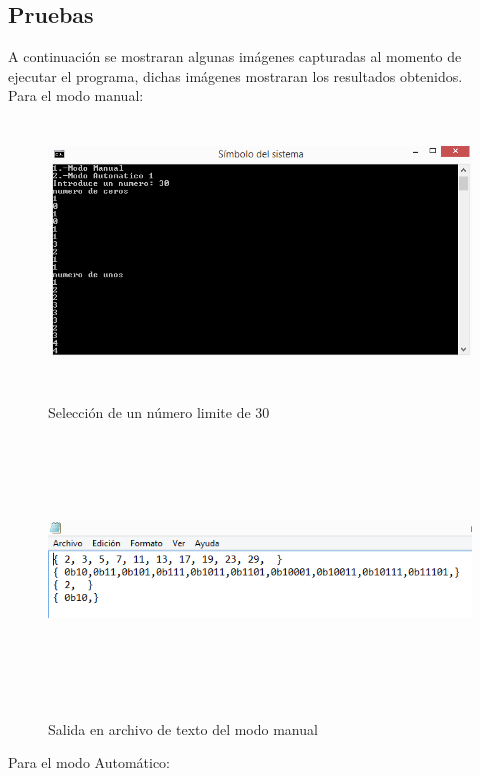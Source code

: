 \documentclass[12pt,letterpaper]{article}
\begin{document}
\subsection{Pruebas}
A continuaci\'on se mostraran algunas im\'agenes capturadas al momento de ejecutar el programa, dichas im\'agenes mostraran los resultados obtenidos.\\

Para el modo manual:\\
\begin{figure}[H]
\includegraphics[width=\textwidth, height=7cm]{modomanualprimo.png}
\label{fig:manual_primo}
\caption{Selecci\'on de un n\'umero limite de 30}
\end{figure}
\begin{figure}[H]
\includegraphics[width=\textwidth, height=7cm]{textomanualprimo.png}
\label{fig:manualtexto_primo}
\caption{Salida en archivo de texto del modo manual}
\end{figure}
Para el modo Autom\'atico:\\
\end{document}
